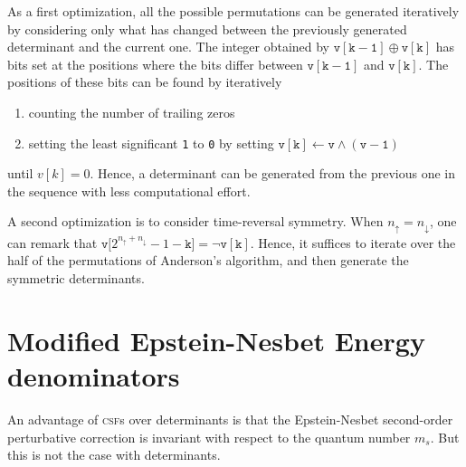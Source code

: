 \documentclass[aip,jcp,reprint,showkeys]{revtex4-1}
\newcommand{\up}{\uparrow}
\newcommand{\dn}{\downarrow}
\newcommand{\one}{{\texttt{1}}}
\newcommand{\zero}{{\texttt{0}}}
\newcommand{\csf}{\textsc{csf}}
\begin{document}
As a first optimization, all the possible permutations can be generated
iteratively by considering only what has changed between the previously
generated determinant and the current one.
The integer obtained by $\mathtt{v[k-1]} \oplus \mathtt{v[k]}$ has bits set at
the positions where the bits differ between $\mathtt{v[k-1]}$ and
$\mathtt{v[k]}$. The positions of these bits can be found by iteratively
\begin{enumerate}
\item counting the number of trailing zeros
\item setting the least significant {\one} to {\zero} by setting
      $\mathtt{v[k] \gets v \wedge (v-1)}$
\end{enumerate}
until $v[k] = 0$. Hence, a determinant can be generated from the previous
one in the sequence with less computational effort.

A second optimization is to consider time-reversal symmetry. When $n_\up =
n_\dn$, one can remark that $\mathtt{v[}2^{n_\up+n_\dn}-1-\mathtt{k]} = \neg \mathtt{v[k]}$.
Hence, it suffices to iterate over the half of the permutations of Anderson's
algorithm, and then generate the symmetric determinants.

\section{Modified Epstein-Nesbet Energy denominators}

An advantage of \csf s over determinants is that the Epstein-Nesbet
second-order perturbative correction is invariant with respect to the quantum
number $m_s$. But this is not the case with determinants.
\end{document}
